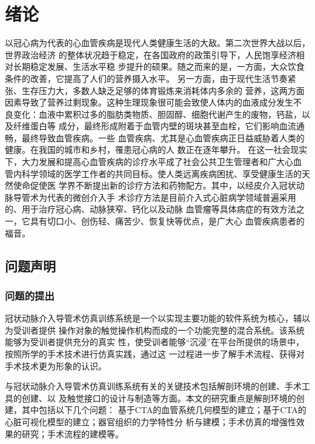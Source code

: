 \chapter{绪\;\;\;论}
\label{chap1}

以冠心病为代表的心血管疾病是现代人类健康生活的大敌。第二次世界大战以后，世界政治经济
的整体状况趋于稳定，在各国政府的政策引导下，人民饱享经济相对长期稳定发展、生活水平稳
步提升的硕果。随之而来的是，一方面，大众饮食条件的改善，它提高了人们的营养摄入水平。
另一方面，由于现代生活节奏紧张、生存压力大，多数人缺乏足够的体育锻炼来消耗体内多余的
营养，这两方面因素导致了营养过剩现象。这种生理现象很可能会致使人体内的血液成分发生不
良变化：血液中累积过多的脂肪类物质、胆固醇、细胞代谢产生的废物，钙盐，以及纤维蛋白等
成分，最终形成附着于血管内壁的斑块甚至血栓，它们影响血流通畅，最终导致血管疾病。一些
血管疾病、尤其是心血管疾病正日益威胁着人类的健康。在我国的城市和乡村，罹患冠心病的人
数正在逐年攀升\cite{moh2010annual}\cite{moh2008annual}\cite{moh2007annual}\cite{moh2005annual}\cite{moh2004annual}。
在这一社会现实下，大力发展和提高心血管疾病的诊疗水平成了社会公共卫生管理者和广大心血
管内科学领域的医学工作者的共同目标。使人类远离疾病困扰、享受健康生活的天然使命促使医
学界不断提出新的诊疗方法和药物配方。其中，以经皮介入冠状动脉导管术为代表的微创介入手
术诊疗方法是目前介入式心脏病学领域普遍采用的、用于治疗冠心病、动脉狭窄、钙化以及动脉
血管瘤等具体病症的有效方法之一，它具有切口小、创伤轻、痛苦少、恢复快等优点，是广大心
血管疾病患者的福音。

\section{问题声明}
\label{sec1-1}

\subsection{问题的提出}
\label{subsec1-1-1}

冠状动脉介入导管术仿真训练系统是一个以实现主要功能的软件系统为核心，辅以为受训者提供
操作对象的触觉操作机构而成的一个功能完整的混合系统。该系统能够为受训者提供充分的真实
性，使受训者能够“沉浸”在平台所提供的场景中，按照所学的手术技术进行仿真实践，通过这
一过程进一步了解手术流程、获得对手术技术更为形象的认识。

与冠状动脉介入导管术仿真训练系统有关的关键技术包括解剖环境的创建、手术工具的创建、以
及触觉接口的设计与制造等方面。本文的研究重点是解剖环境的创建，其中包括以下几个问题：
基于CTA的血管系统几何模型的建立；基于CTA的心脏可视化模型的建立；器官组织的力学特性分
析与建模；手术仿真的增强性效果的研究；手术流程的建模等。

